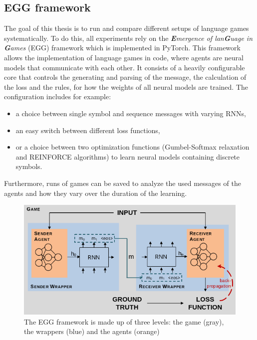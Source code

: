 \subsection{EGG framework}
\label{sec:methodology:egg}
The goal of this thesis is to run and compare different setups of language games systematically.
To do this, all experiments rely on the \emph{\textbf{E}mergence of lan\textbf{G}uage in \textbf{G}ames} (EGG) framework \citep{Kharitonov2019} which is implemented in PyTorch.
This framework allows the implementation of language games in code, where agents are neural models that communicate with each other.
It consists of a heavily configurable core that controls the generating and parsing of the message, the calculation of the loss and the rules, for how the weights of all neural models are trained.
The configuration includes for example:
\begin{itemize}[noitemsep,topsep=0pt]
    \item a choice between single symbol and sequence messages with varying RNNs,
    \item an easy switch between different loss functions,
    \item or a choice between two optimization functions (Gumbel-Softmax relaxation and REINFORCE algorithms) to learn neural models containing discrete symbols.
\end{itemize}
Furthermore, runs of games can be saved to analyze the used messages of the agents and how they vary over the duration of the learning.

\begin{figure}[ht]
    \centering
    \includegraphics[width=.8\linewidth]{figures/egg_framework.png}
    \caption{The EGG framework is made up of three levels: the game (gray), the wrappers (blue) and the agents (orange)}
    \label{fig:egg-framework}
\end{figure}

